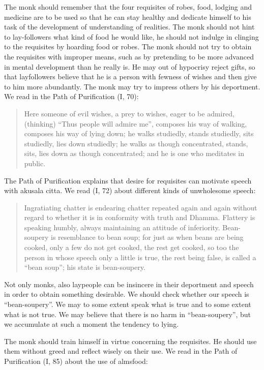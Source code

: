 \documentclass{book}
\begin{document}
The monk should remember that the four requisites of robes, food,
lodging and medicine are to be used so that he can stay healthy and
dedicate himself to his task of the development of understanding of
realities. The monk should not hint to lay-followers what kind of food
he would like, he should not indulge in clinging to the requisites by
hoarding food or robes. The monk should not try to obtain the requisites
with improper means, such as by pretending to be more advanced in mental
development than he really is. He may out of hypocrisy reject gifts, so
that layfollowers believe that he is a person with fewness of wishes and
then give to him more abundantly. The monk may try to impress others by
his deportment. We read in the Path of Purification (I, 70):

\begin{quote}
Here someone of evil wishes, a prey to wishes, eager to be admired,
(thinking) ``Thus people will admire me'', composes his way of walking,
composes his way of lying down; he walks studiedly, stands studiedly,
sits studiedly, lies down studiedly; he walks as though concentrated,
stands, sits, lies down as though concentrated; and he is one who
meditates in public.
\end{quote}

The Path of Purification explains that desire for requisites can
motivate speech with akusala citta. We read (I, 72) about different
kinds of unwholesome speech:

\begin{quote}
Ingratiating chatter is endearing chatter repeated again and again
without regard to whether it is in conformity with truth and Dhamma.
Flattery is speaking humbly, always maintaining an attitude of
inferiority. Bean-soupery is resemblance to bean soup; for just as when
beans are being cooked, only a few do not get cooked, the rest get
cooked, so too the person in whose speech only a little is true, the
rest being false, is called a ``bean soup''; his state is bean-soupery.
\end{quote}

Not only monks, also laypeople can be insincere in their deportment and
speech in order to obtain something desirable. We should check whether
our speech is ``bean-soupery''. We may to some extent speak what is true
and to some extent what is not true. We may believe that there is no
harm in ``bean-soupery'', but we accumulate at such a moment the
tendency to lying.

The monk should train himself in virtue concerning the requisites. He
should use them without greed and reflect wisely on their use. We read
in the Path of Purification (I, 85) about the use of almsfood:
\end{document}
